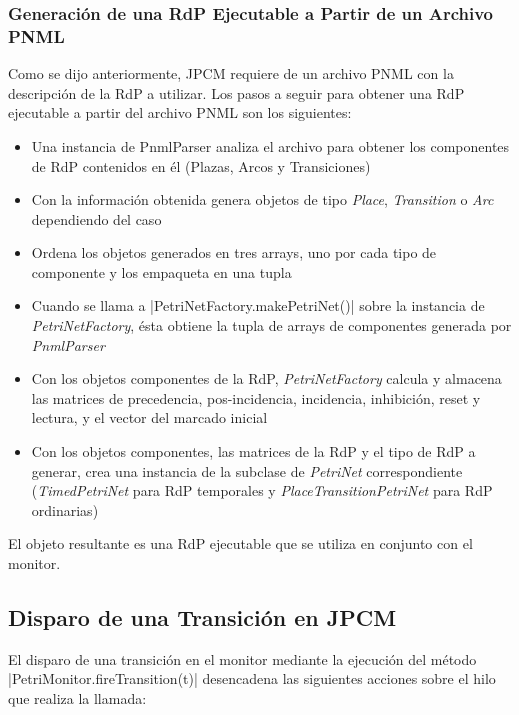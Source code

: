 \subsubsection{Generación de una RdP Ejecutable a Partir de un Archivo PNML}
Como se dijo anteriormente, JPCM requiere de un archivo PNML con la descripción
de la RdP a utilizar. Los pasos a seguir para obtener una RdP ejecutable a
partir del archivo PNML son los siguientes:
\begin{itemize}
  \item Una instancia de PnmlParser analiza el archivo para obtener los
  componentes de RdP contenidos en él (Plazas, Arcos y Transiciones)
  \item Con la información obtenida genera objetos de tipo \textit{Place},
  \textit{Transition} o \textit{Arc} dependiendo del caso
  \item Ordena los objetos generados en tres arrays, uno por cada tipo de
  componente y los empaqueta en una tupla
  \item Cuando se llama a |PetriNetFactory.makePetriNet()| sobre la
  instancia de \textit{PetriNetFactory}, ésta obtiene la tupla de arrays de
  componentes generada por \textit{PnmlParser}
  \item Con los objetos componentes de la RdP, \textit{PetriNetFactory} calcula
  y almacena las matrices de precedencia, pos-incidencia, incidencia, inhibición,
  reset y lectura, y el vector del marcado inicial
  \item Con los objetos componentes, las matrices de la RdP y el tipo de RdP a
  generar, crea una instancia de la subclase de \textit{PetriNet}
  correspondiente (\textit{TimedPetriNet} para RdP temporales y
  \textit{PlaceTransitionPetriNet} para RdP ordinarias)
\end{itemize}

El objeto resultante es una RdP ejecutable que se utiliza en conjunto con el
monitor.

\subsection{Disparo de una Transición en JPCM}
El disparo de una transición en el monitor mediante la ejecución del método
|PetriMonitor.fireTransition(t)| desencadena las siguientes acciones
sobre el hilo que realiza la llamada:


